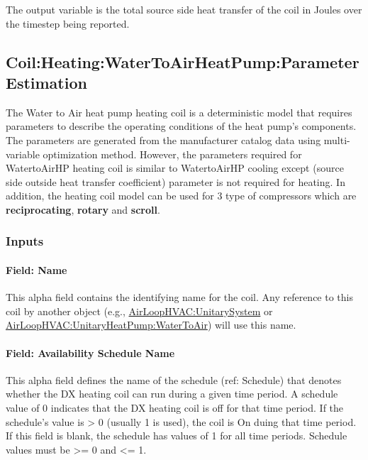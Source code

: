 The output variable is the total source side heat transfer of the coil in Joules over the timestep being reported.

\subsection{Coil:Heating:WaterToAirHeatPump:ParameterEstimation}\label{coilheatingwatertoairheatpumpparameterestimation}

The Water to Air heat pump heating coil is a deterministic model that requires parameters to describe the operating conditions of the heat pump's components. The parameters are generated from the manufacturer catalog data using multi-variable optimization method. However, the parameters required for WatertoAirHP heating coil is similar to WatertoAirHP cooling except (source side outside heat transfer coefficient) parameter is not required for heating. In addition, the heating coil model can be used for 3 type of compressors which are \textbf{reciprocating}, \textbf{rotary} and \textbf{scroll}.

\subsubsection{Inputs}\label{inputs-32}

\paragraph{Field: Name}\label{field-name-31}

This alpha field contains the identifying name for the coil. Any reference to this coil by another object (e.g., \hyperref[airloophvacunitarysystem]{AirLoopHVAC:UnitarySystem} or \hyperref[airloophvacunitaryheatpumpwatertoair]{AirLoopHVAC:UnitaryHeatPump:WaterToAir}) will use this name.

\paragraph{Field: Availability Schedule Name}\label{field-availability-schedule-name-16-009}

This alpha field defines the name of the schedule (ref: Schedule) that denotes whether the DX heating coil can run during a given time period. A schedule value of 0 indicates that the DX heating coil is off for that time period. If the schedule's value is \textgreater{} 0 (usually 1 is used), the coil is On duing that time period. If this field is blank, the schedule has values of 1 for all time periods. Schedule values must be \textgreater{}= 0 and \textless{}= 1.

